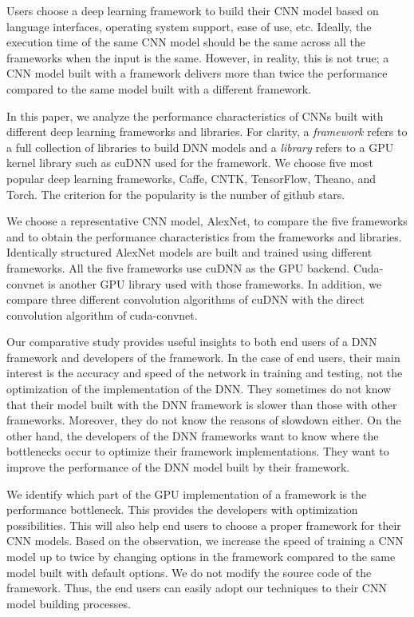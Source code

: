 Users choose a deep learning framework to build their CNN model based on language interfaces, operating system support, ease of use, etc. Ideally, the execution time of the same CNN model should be the same across all the frameworks when the input is the same. However, in reality, this is not true; a CNN model built with a framework delivers more than twice the performance compared to the same model built with a different framework\cite{DBLP:journals/corr/BahrampourRSS15,DBLP:journals/corr/ShiWXC16}. 

In this paper, we analyze the performance characteristics of CNNs built with different deep learning frameworks and libraries. For clarity, a \textit{framework} refers to a full collection of libraries to build DNN models and a \textit{library} refers to a GPU kernel library such as cuDNN used for the framework. We choose five most popular deep learning frameworks, Caffe\cite{jia2014caffe}, CNTK\cite{cntk}, TensorFlow\cite{tensorflow2015-whitepaper}, Theano\cite{DBLP:journals/corr/Al-RfouAAa16}, and Torch\cite{torch}.
The criterion for the popularity is the number of github stars\cite{github}.

We choose a representative CNN model, AlexNet\cite{krizhevsky2012imagenet}, to compare the five frameworks and to obtain the performance characteristics from the frameworks and libraries. Identically structured AlexNet models are built and trained using different frameworks. All the five frameworks use cuDNN as the GPU backend. Cuda-convnet\cite{cuda-convnet} is another GPU library used with those frameworks. In addition, we compare three different convolution algorithms of cuDNN with the direct convolution algorithm of cuda-convnet.

Our comparative study provides useful insights to both end users of a DNN framework and developers of the framework. In the case of end users, their main interest is the accuracy and speed of the network in training and testing, not the optimization of the implementation of the DNN. They sometimes do not know that their model built with the DNN framework is slower than those with other frameworks. Moreover, they do not know the reasons of slowdown either. On the other hand, the developers of the DNN frameworks want to know where the bottlenecks occur to optimize their framework implementations. They want to improve the performance of the DNN model built by their framework.

We identify which part of the GPU implementation of a framework is the performance bottleneck. This provides the developers with optimization possibilities. This will also help end users to choose a proper framework for their CNN models. Based on the observation, we increase the speed of training a CNN model up to twice by changing options in the framework compared to the same model built with default options. We do not modify the source code of the framework. Thus, the end users can easily adopt our techniques to their CNN model building processes.

